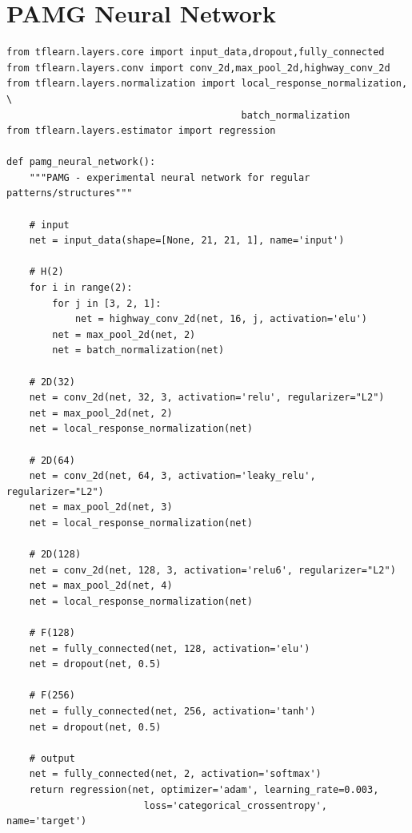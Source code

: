 \documentclass[letterpaper, 12pt]{article}
\begin{document}
\section{PAMG Neural Network}

\begin{lstlisting}
from tflearn.layers.core import input_data,dropout,fully_connected
from tflearn.layers.conv import conv_2d,max_pool_2d,highway_conv_2d
from tflearn.layers.normalization import local_response_normalization, \
                                         batch_normalization
from tflearn.layers.estimator import regression

def pamg_neural_network():
    """PAMG - experimental neural network for regular patterns/structures"""

    # input
    net = input_data(shape=[None, 21, 21, 1], name='input')

    # H(2)
    for i in range(2):
        for j in [3, 2, 1]:
            net = highway_conv_2d(net, 16, j, activation='elu')
        net = max_pool_2d(net, 2)
        net = batch_normalization(net)

    # 2D(32)
    net = conv_2d(net, 32, 3, activation='relu', regularizer="L2")
    net = max_pool_2d(net, 2)
    net = local_response_normalization(net)

    # 2D(64)
    net = conv_2d(net, 64, 3, activation='leaky_relu', regularizer="L2")
    net = max_pool_2d(net, 3)
    net = local_response_normalization(net)

    # 2D(128)
    net = conv_2d(net, 128, 3, activation='relu6', regularizer="L2")
    net = max_pool_2d(net, 4)
    net = local_response_normalization(net)

    # F(128)
    net = fully_connected(net, 128, activation='elu')
    net = dropout(net, 0.5)

    # F(256)
    net = fully_connected(net, 256, activation='tanh')
    net = dropout(net, 0.5)

    # output
    net = fully_connected(net, 2, activation='softmax')
    return regression(net, optimizer='adam', learning_rate=0.003,
                        loss='categorical_crossentropy', name='target')
\end{lstlisting}

\end{document}
